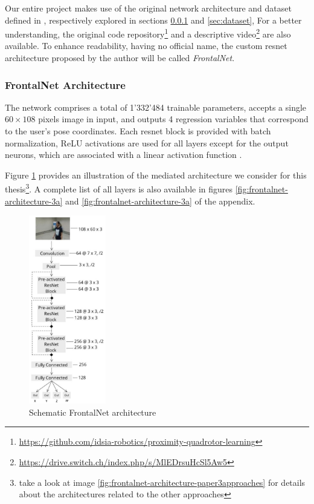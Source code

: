 Our entire project makes use of the original network architecture and dataset defined in \cite{mantegazza2019visionbased}, respectively explored in sections \ref{subsec:frontalnet-architecture} and \ref{sec:dataset}, For a better understanding, the original code repository\footnote{\url{https://github.com/idsia-robotics/proximity-quadrotor-learning}} and a descriptive video\footnote{\url{https://drive.switch.ch/index.php/s/MlEDrsuHcSl5Aw5}} are also available. 
To enhance readability, having no official name, the custom \gls{resnet} architecture proposed by the author will be called \textit{FrontalNet}.


\subsubsection{FrontalNet Architecture}
\label{subsec:frontalnet-architecture}

The network comprises a total of 1'332'484 trainable parameters, accepts a single $60 \times 108$ pixels image in input, and outputs 4 regression variables that correspond to the user's pose coordinates. Each \gls{resnet} block is provided with batch normalization, ReLU activations \cite{act-relu} are used for all layers except for the output neurons, which are associated with a linear activation function \cite{act-linear}. 

Figure \ref{fig:frontalnet-architecture-1} provides an illustration of the mediated architecture we consider for this thesis\footnote{take a look at image \ref{fig:frontalnet-architecture-paper3approaches} for details about the architectures related to the other approaches}. A complete list of all layers is also available in figures \ref{fig:frontalnet-architecture-3a} and \ref{fig:frontalnet-architecture-3a} of the appendix. 

\begin{figure}[!h]
	\centering
	\includegraphics[width=0.3\textwidth]{"contents/images/03-frontalnet-1A"}
	\caption[Schematic FrontalNet architecture]{Schematic FrontalNet architecture \cite{mantegazza2019visionbased}}
	\label{fig:frontalnet-architecture-1}
\end{figure}


